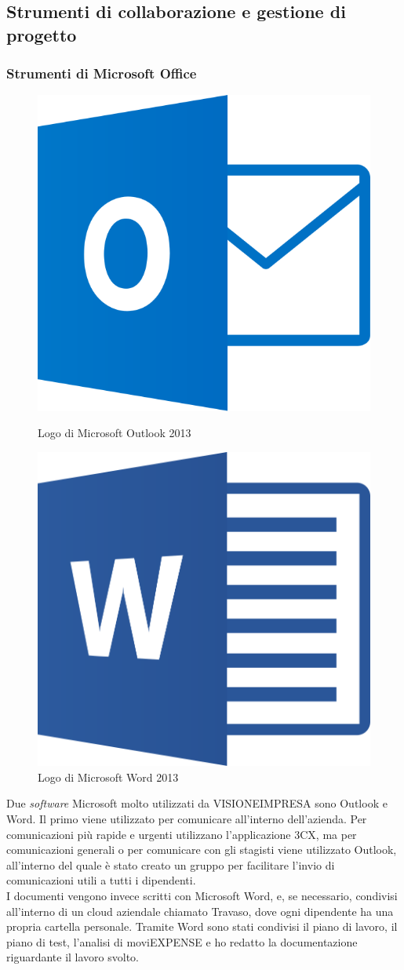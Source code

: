 \subsection{Strumenti di collaborazione e gestione di progetto}

\subsubsection{Strumenti di Microsoft Office}

\begin{figure}[H]
    \begin{minipage}[b]{0.45\textwidth}
    \centering
    \includegraphics[width=.4\textwidth]{images/loghi/outlook-logo.png}
    \caption{Logo di Microsoft Outlook 2013}
    \end{minipage}
    \hfill
    \begin{minipage}[b]{0.45\textwidth}
    \centering
    \includegraphics[width=.4\textwidth]{images/loghi/Microsoft_Word.png}
    \caption{Logo di Microsoft Word 2013}
    \end{minipage}
\end{figure}

Due \textit{software} Microsoft molto utilizzati da VISIONEIMPRESA sono Outlook e Word. Il primo viene utilizzato per comunicare all'interno dell'azienda. Per comunicazioni più rapide e urgenti utilizzano l'applicazione 3CX, ma per comunicazioni generali o per comunicare con gli stagisti viene utilizzato Outlook, all'interno del quale è stato creato un gruppo per facilitare l'invio di comunicazioni utili a tutti i dipendenti.\\
I documenti vengono invece scritti con Microsoft Word, e, se necessario, condivisi all'interno di un cloud aziendale chiamato Travaso, dove ogni dipendente ha una propria cartella personale. Tramite Word sono stati condivisi il piano di lavoro, il piano di test, l'analisi di moviEXPENSE e ho redatto la documentazione riguardante il lavoro svolto.


